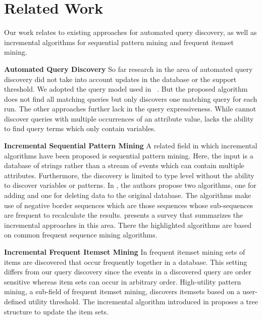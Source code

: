 \section{Related Work}
\label{sec:related-work}
Our work relates to existing approaches for automated query discovery, as
well as incremental algorithms for sequential pattern mining and frequent
itemset mining.

\textbf{Automated Query Discovery}
So far research in the area of automated query discovery did not take into account
updates in the database or the support threshold.
We adopted the query model used in ~\cite{DBLP:conf/btw/Kleest-Meissner23}. But
the proposed algorithm does not find all matching queries but only discovers
one matching query for each run.
The other approaches \cite{ilminer,icep} further lack in the query
expressiveness. While \cite{icep} cannot discover queries with
multiple occurrences of an attribute value, \cite{ilminer} lacks
the ability to find query terms which only contain variables.

\textbf{Incremental Sequential Pattern Mining}
A related field in which incremental algorithms have been proposed
is sequential pattern mining. Here, the input is a database of strings
rather than a stream of events which can contain multiple attributes.
Furthermore, the discovery is limited to type level without the
ability to discover variables or patterns.
In \cite{zheng2002,zheng2003}, the authors propose two algorithms, one for
adding
and one for deleting data to the original database. The algorithms make use of
negative border sequences which are those sequences whose sub-sequences
are frequent to recalculate the results.
\cite{mallick2013} presents a survey that summarizes the incremental
approaches in this
area. There the highlighted algorithms are based on common frequent
sequence mining algorithms.





\textbf{Incremental Frequent Itemset Mining}
In frequent itemset mining sets of items are discovered that occur frequently
together in a database. This setting differs from our query discovery since
the events in a discovered query are order sensitive whereas item sets can occur
in arbitrary order.
High-utility pattern mining, a sub-field of frequent itemset mining,
discovers itemsets based on a user-defined utility threshold.
The incremental algorithm introduced in \cite{yun2015} proposes a tree
structure to update the item sets.

